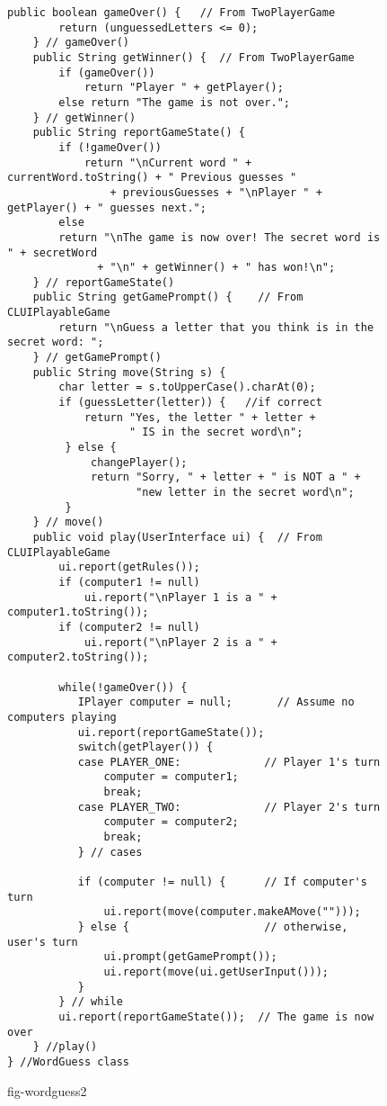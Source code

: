 \begin{figure}[h!]
\jjjprogstart
\begin{jjjlisting}[29pc]
\begin{lstlisting}[basicstyle=\scriptsize]
    public boolean gameOver() {   // From TwoPlayerGame
        return (unguessedLetters <= 0);
    } // gameOver()
    public String getWinner() {  // From TwoPlayerGame
        if (gameOver())
            return "Player " + getPlayer();
        else return "The game is not over.";
    } // getWinner()
    public String reportGameState() {   
        if (!gameOver())
            return "\nCurrent word " + currentWord.toString() + " Previous guesses " 
                + previousGuesses + "\nPlayer " + getPlayer() + " guesses next.";
        else
	    return "\nThe game is now over! The secret word is " + secretWord 
              + "\n" + getWinner() + " has won!\n";
    } // reportGameState()
    public String getGamePrompt() {    // From CLUIPlayableGame
        return "\nGuess a letter that you think is in the secret word: ";
    } // getGamePrompt()
    public String move(String s) {   
        char letter = s.toUpperCase().charAt(0);
        if (guessLetter(letter)) {   //if correct 
            return "Yes, the letter " + letter +
                   " IS in the secret word\n";
         } else {   
             changePlayer();
             return "Sorry, " + letter + " is NOT a " +
                    "new letter in the secret word\n";
         } 
    } // move()
    public void play(UserInterface ui) {  // From CLUIPlayableGame
        ui.report(getRules());
        if (computer1 != null) 
            ui.report("\nPlayer 1 is a " + computer1.toString());
        if (computer2 != null)
            ui.report("\nPlayer 2 is a " + computer2.toString());

        while(!gameOver()) {  
           IPlayer computer = null;       // Assume no computers playing
           ui.report(reportGameState());
           switch(getPlayer()) {
           case PLAYER_ONE:             // Player 1's turn
               computer = computer1;
               break;
           case PLAYER_TWO:             // Player 2's turn
               computer = computer2;
               break;
           } // cases

           if (computer != null) {      // If computer's turn
               ui.report(move(computer.makeAMove("")));
           } else {                     // otherwise, user's turn
               ui.prompt(getGamePrompt());
               ui.report(move(ui.getUserInput()));
           }
        } // while
        ui.report(reportGameState());  // The game is now over
    } //play()
} //WordGuess class
\end{lstlisting}
\end{jjjlisting}
{fig-wordguess2}
\end{figure}

